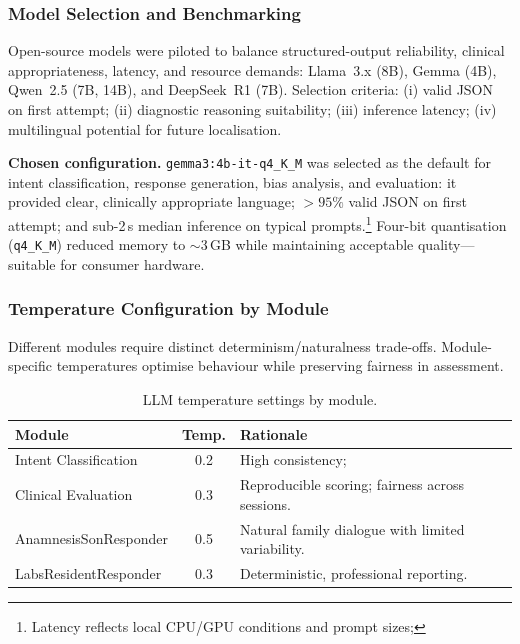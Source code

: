 \subsubsection{Model Selection and Benchmarking}

Open-source models were piloted to balance structured-output reliability,
clinical appropriateness, latency, and resource demands: Llama~3.x (8B), Gemma
(4B), Qwen~2.5 (7B, 14B), and DeepSeek~R1 (7B). Selection criteria:
(i) valid JSON on first attempt; (ii) diagnostic reasoning suitability;
(iii) inference latency; (iv) multilingual potential for future localisation.

\medskip
\noindent
\textbf{Chosen configuration.} \texttt{gemma3:4b-it-q4\_K\_M} was selected as the default
for intent classification, response generation, bias analysis, and evaluation:
it provided clear, clinically appropriate language; $>95\%$ valid JSON on first
attempt; and sub-2\,s median inference on typical prompts.\footnote{Latency reflects local CPU/GPU conditions and prompt sizes;}
Four-bit quantisation (\texttt{q4\_K\_M}) reduced memory to $\sim$3\,GB while maintaining
acceptable quality—suitable for consumer hardware.

\subsubsection{Temperature Configuration by Module}

Different modules require distinct determinism/naturalness trade-offs. Module-specific
temperatures optimise behaviour while preserving fairness in assessment.

\begin{table}[h]
\centering
\caption{LLM temperature settings by module.}
\label{tab:temps}
\setlength{\tabcolsep}{8pt}
\renewcommand{\arraystretch}{1.12}
\begin{tabular}{l c p{6cm}}
\toprule
\textbf{Module} & \textbf{Temp.} & \textbf{Rationale} \\
\midrule
Intent Classification & 0.2 & High consistency; \\
Clinical Evaluation & 0.3 & Reproducible scoring; fairness across sessions. \\
AnamnesisSonResponder & 0.5 & Natural family dialogue with limited variability. \\
LabsResidentResponder & 0.3 & Deterministic, professional reporting. \\
\bottomrule
\end{tabular}
\end{table}

